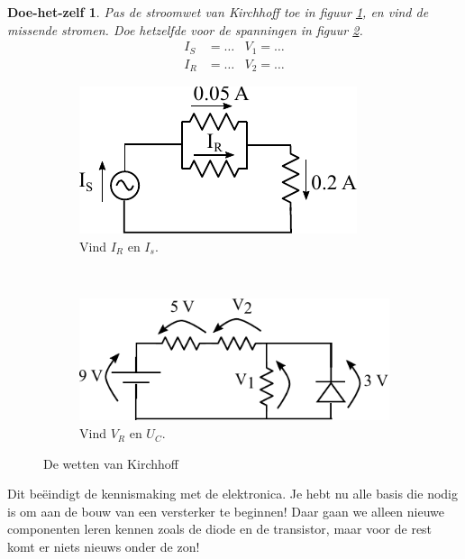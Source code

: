 \documentclass{article}
\newtheorem{DIY}{Doe-het-zelf}
\begin{document}
			\begin{DIY} Pas de stroomwet van Kirchhoff toe in figuur \ref{subfig:kcl_oef}, en vind de missende stromen. Doe hetzelfde voor de spanningen in figuur \ref{subfig:kvl_oef}.
			\begin{align*}
			    I_S &= \ldots & V_1 = \ldots\\
			    I_R &= \ldots & V_2 = \ldots
			\end{align*}
			\end{DIY}

			\begin{figure}[htbp]
				\centering
				\begin{subfigure}[b]{0.45\linewidth}
					\centering
					\includegraphics{kcl_oef.pdf}
					\caption{Vind $I_R$ en $I_s$.}
					\label{subfig:kcl_oef}
				\end{subfigure}
				~
				\begin{subfigure}[b]{0.45\linewidth}
					\centering
					\includegraphics[width=\linewidth]{kvl_oef.pdf}
					\caption{Vind $V_R$ en $U_C$. }
					\label{subfig:kvl_oef}
				\end{subfigure}
			\caption{De wetten van Kirchhoff}
			\label{fig:kirchoff_oef}
			\end{figure}

			Dit be\"eindigt de kennismaking met de elektronica. Je hebt nu alle basis die nodig is om aan de bouw van een versterker te beginnen! Daar gaan we alleen nieuwe componenten leren kennen zoals de diode en de transistor, maar voor de rest komt er niets nieuws onder de zon!
\end{document}
